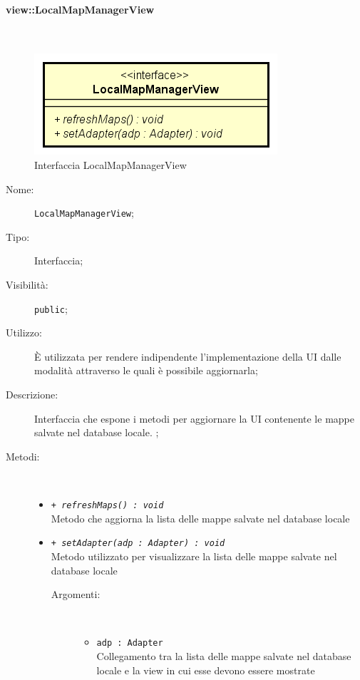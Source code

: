 \documentclass[../DefinizioneDiProdotto.tex]{subfiles}
\begin{document}
\paragraph{view::LocalMapManagerView}
\
\begin{figure}[H]
	\centering
	\includegraphics[width=\maxwidth]{img/LocalMapManagerView.png}
	\caption{Interfaccia LocalMapManagerView}\label{fig:view::LocalMapManagerView} 
\end{figure}
\begin{description}
	\item[Nome:] \texttt{LocalMapManagerView};
	\item[Tipo:] Interfaccia;
	\item[Visibilità:] \texttt{public};
	\item[Utilizzo:] È utilizzata per rendere indipendente l'implementazione della UI dalle modalità attraverso le quali è possibile aggiornarla;
	\item[Descrizione:] Interfaccia che espone i metodi per aggiornare la UI contenente le mappe salvate nel database locale. ;
	\item[Metodi:] \
	\begin{itemize}
		\item \texttt{+ \textit{refreshMaps() : void}}\\
		Metodo che aggiorna la lista delle mappe salvate nel database locale
		\item \texttt{+ \textit{setAdapter(adp : Adapter) : void}}\\
		Metodo utilizzato per visualizzare la lista delle mappe salvate nel database locale
		\begin{description}
			\item[Argomenti:] \
			\begin{itemize}
				\item \texttt{adp : Adapter}\\
				Collegamento tra la lista delle mappe salvate nel database locale e la view in cui esse devono essere mostrate\end{itemize}
		\end{description}
	\end{itemize}
\end{description}
\end{document}
